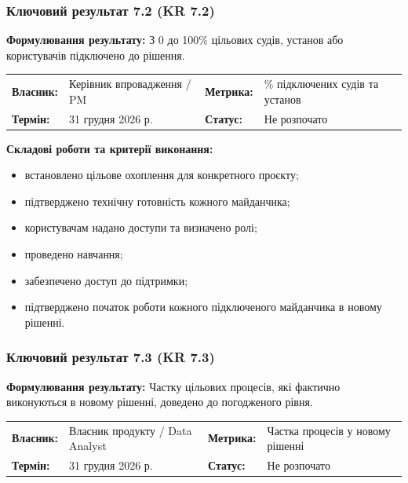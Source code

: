\documentclass{article}
\begin{document}
\subsubsection{Ключовий результат 7.2 (KR 7.2)}

\textbf{Формулювання результату:} З 0 до 100\% цільових судів, установ або користувачів підключено до рішення.

\noindent\begin{tabular}{@{}p{2.2cm}p{4.5cm}p{2.2cm}p{4.5cm}@{}}
\toprule
\textbf{Власник:} & Керівник впровадження / PM & \textbf{Метрика:} & \% підключених судів та установ \\
\textbf{Термін:} & 31 грудня 2026 р. & \textbf{Статус:} & Не розпочато \\
\bottomrule
\end{tabular}

\vspace{10pt}
\textbf{Складові роботи та критерії виконання:}
\begin{itemize}
    \item встановлено цільове охоплення для конкретного проєкту;
    \item підтверджено технічну готовність кожного майданчика;
    \item користувачам надано доступи та визначено ролі;
    \item проведено навчання;
    \item забезпечено доступ до підтримки;
    \item підтверджено початок роботи кожного підключеного майданчика в новому рішенні.
\end{itemize}

\subsubsection{Ключовий результат 7.3 (KR 7.3)}

\textbf{Формулювання результату:} Частку цільових процесів, які фактично виконуються в новому рішенні, доведено до погодженого рівня.

\noindent\begin{tabular}{@{}p{2.2cm}p{4.5cm}p{2.2cm}p{4.5cm}@{}}
\toprule
\textbf{Власник:} & Власник продукту / Data Analyst & \textbf{Метрика:} & Частка процесів у новому рішенні \\
\textbf{Термін:} & 31 грудня 2026 р. & \textbf{Статус:} & Не розпочато \\
\bottomrule
\end{tabular}
\end{document}
